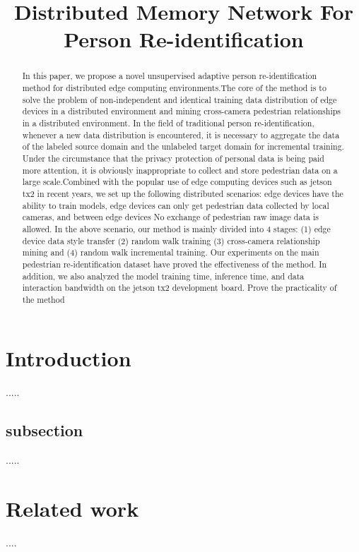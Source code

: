 \documentclass{article}
\title{Distributed Memory Network For Person Re-identification}
\begin{document}
\maketitle

\begin{abstract}
    In this paper,  we propose a novel unsupervised adaptive person re-identification method for distributed edge computing environments.The core of the method is to solve the problem of non-independent and identical training data distribution of edge devices in a distributed environment and mining cross-camera pedestrian relationships in a distributed environment.
    In the field of traditional person re-identification, whenever a new data distribution is encountered, it is necessary to aggregate the data of the labeled source domain and the unlabeled target domain for incremental training.  Under the circumstance that the privacy protection of personal data is being paid more  attention, it is obviously inappropriate to collect and store pedestrian data on a large scale.Combined with the popular use of edge computing devices such as jetson tx2 in recent years, we set up the following distributed scenarios: edge devices have the ability to train models, edge devices can only get pedestrian data collected by local cameras, and between edge devices No exchange of pedestrian raw image data is allowed.
    In the above scenario, our method is mainly divided into 4 stages: (1) edge device data style transfer (2) random walk training (3) cross-camera relationship mining and (4) random walk incremental training.
    Our experiments on the main pedestrian re-identification dataset have proved the effectiveness of the method. In addition, we also analyzed the model training time, inference time, and data interaction bandwidth on the jetson tx2 development board. Prove the practicality of the method
    
\end{abstract}

\section{Introduction}
.....

\subsection{subsection}
.....

\section{Related work}
....
\end{document}
